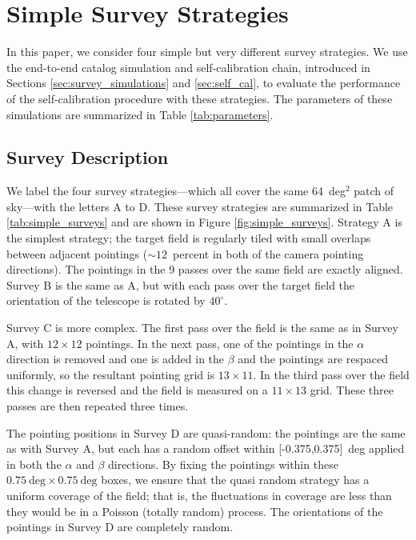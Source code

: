 \documentclass[preprint,pdftex]{aastex}
\begin{document}
\section{Simple Survey Strategies}
\label{sec:simple_surveys}
In this paper, we consider four simple but very different survey strategies. We use the end-to-end catalog simulation and self-calibration chain, introduced in Sections \ref{sec:survey_simulations} and \ref{sec:self_cal}, to evaluate the performance of the self-calibration procedure with these strategies. The parameters of these simulations are summarized in Table \ref{tab:parameters}.

\subsection{Survey Description}
We label the four survey strategies---which all cover the same 64~deg$^2$ patch of sky---with the letters A to D. These survey strategies are summarized in Table \ref{tab:simple_surveys} and are shown in Figure \ref{fig:simple_surveys}. Strategy A is the simplest strategy; the target field is regularly tiled with small overlaps between adjacent pointings ($\sim 12$~percent in both of the camera pointing directions). The pointings in the 9 passes over the same field are exactly aligned. Survey B is the same as A, but with each pass over the target field the orientation of the telescope is rotated by $40^\circ$. 

Survey C is more complex. The first pass over the field is the same as in Survey A, with $12 \times 12$ pointings. In the next pass, one of the pointings in the $\alpha$ direction is removed and one is added in the $\beta$ and the pointings are respaced uniformly, so the resultant pointing grid is $13 \times 11$. In the third pass over the field this change is reversed and the field is measured on a $11 \times 13$ grid. These three passes are then repeated three times. 

The pointing positions in Survey D are quasi-random: the pointings are the same as with Survey A, but each has a random offset within [-0.375,0.375]~deg applied in both the $\alpha$ and $\beta$ directions. By fixing the pointings within these $0.75~\text{deg} \times 0.75~\text{deg}$ boxes, we ensure that the quasi random strategy has a uniform coverage of the field; that is, the fluctuations in coverage are less than they would be in a Poisson (totally random) process. The orientations of the pointings in Survey D are completely random. 
\end{document}
